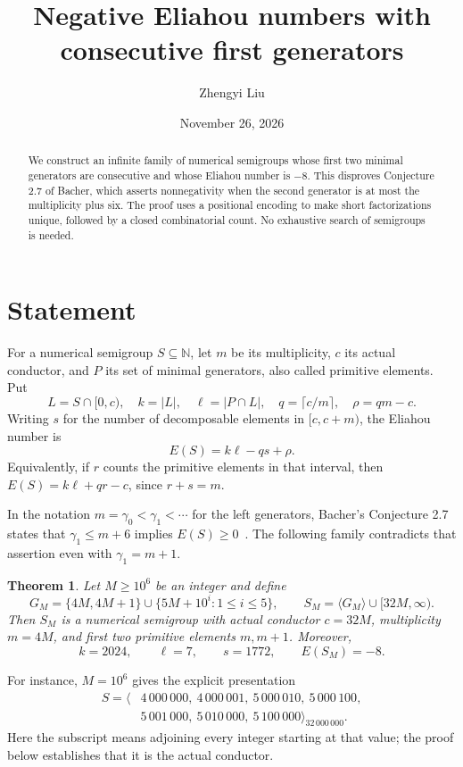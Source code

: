 \documentclass[11pt]{article}
\title{Negative Eliahou numbers with consecutive first generators}
\author{Zhengyi Liu}
\date{November 26, 2026}
\newtheorem{theorem}{Theorem}
\newcommand{\N}{\mathbb N}
\newcommand{\card}[1]{\lvert #1\rvert}
\begin{document}
\maketitle
\begin{abstract}
We construct an infinite family of numerical semigroups whose first two
minimal generators are consecutive and whose Eliahou number is $-8$.
This disproves Conjecture 2.7 of Bacher, which asserts nonnegativity when
the second generator is at most the multiplicity plus six.
The proof uses a positional encoding to make short factorizations unique,
followed by a closed combinatorial count. No exhaustive search of
semigroups is needed.
\end{abstract}

\section{Statement}
For a numerical semigroup $S\subseteq\N$, let $m$ be its multiplicity,
$c$ its actual conductor, and $P$ its set of minimal generators, also
called primitive elements. Put
\[
 L=S\cap[0,c),\quad k=\card L,\quad \ell=\card{P\cap L},\quad
 q=\lceil c/m\rceil,\quad \rho=qm-c.
\]
Writing $s$ for the number of decomposable elements in $[c,c+m)$,
the Eliahou number is
\begin{equation}\label{eq:E}
 E(S)=k\ell-qs+\rho.
\end{equation}
Equivalently, if $r$ counts the primitive elements in that interval,
then $E(S)=k\ell+qr-c$, since $r+s=m$.

In the notation $m=\gamma_0<\gamma_1<\cdots$ for the left generators,
Bacher's Conjecture 2.7 states that $\gamma_1\le m+6$ implies
$E(S)\ge0$~\cite{Bacher}. The following family contradicts that assertion
even with $\gamma_1=m+1$.

\begin{theorem}\label{thm:main}
Let $M\ge10^6$ be an integer and define
\[
 G_M=\{4M,4M+1\}\cup\{5M+10^i:1\le i\le5\},
 \qquad S_M=\langle G_M\rangle\cup[32M,\infty).
\]
Then $S_M$ is a numerical semigroup with actual conductor $c=32M$,
multiplicity $m=4M$, and first two primitive elements $m,m+1$.
Moreover,
\[
 k=2024,\qquad \ell=7,\qquad s=1772,\qquad E(S_M)=-8.
\]
\end{theorem}

For instance, $M=10^6$ gives the explicit presentation
\begin{align*}
 S=\langle&4\,000\,000,\ 4\,000\,001,\ 5\,000\,010,\ 5\,000\,100,\\
           &5\,001\,000,\ 5\,010\,000,\ 5\,100\,000\rangle_{32\,000\,000}.
\end{align*}
Here the subscript means adjoining every integer starting at that value;
the proof below establishes that it is the actual conductor.
\end{document}
